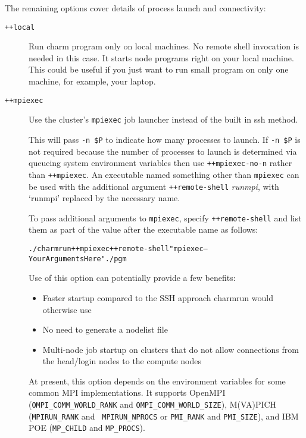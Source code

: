 The remaining options cover details of process launch and connectivity:

\begin{description}

\item[{\tt ++local}] Run charm program only on local machines. No
 remote shell invocation is needed in this case. It starts node programs
 right on your local machine. This could be useful if you just want to
 run small program on only one machine, for example, your laptop.


\item[{\tt ++mpiexec}]
\label{mpiexec}
Use the cluster's {\tt mpiexec} job launcher instead of the built in ssh
method.

This will pass {\tt -n \$P} to indicate how many processes to
launch.
If {\tt -n \$P} is not required because the number of processes
to launch is determined via queueing system environment variables
then use {\tt ++mpiexec-no-n} rather than {\tt ++mpiexec}.
An executable named something other than {\tt mpiexec} can be
used with the additional argument {\tt ++remote-shell} {\it runmpi},
with `runmpi' replaced by the necessary name.

To pass additional arguments to {\tt mpiexec}, specify {\tt ++remote-shell}
and list them as part of the value after the executable name as follows:

\begin{alltt}
./charmrun ++mpiexec ++remote-shell "mpiexec --YourArgumentsHere" ./pgm
\end{alltt}

Use of this option can potentially provide a few benefits:

\begin{itemize}
\item Faster startup compared to the SSH approach charmrun would
  otherwise use
\item No need to generate a nodelist file
\item Multi-node job startup on clusters that do not allow connections
  from the head/login nodes to the compute nodes
\end{itemize}

At present, this option depends on the environment variables for some
common MPI implementations. It supports OpenMPI ({\tt OMPI\_COMM\_WORLD\_RANK} and
{\tt OMPI\_COMM\_WORLD\_SIZE}), M(VA)PICH ({\tt MPIRUN\_RANK} and {\tt
  MPIRUN\_NPROCS} or {\tt PMI\_RANK} and {\tt PMI\_SIZE}),
and IBM POE ({\tt MP\_CHILD} and {\tt MP\_PROCS}).


\end{description}
